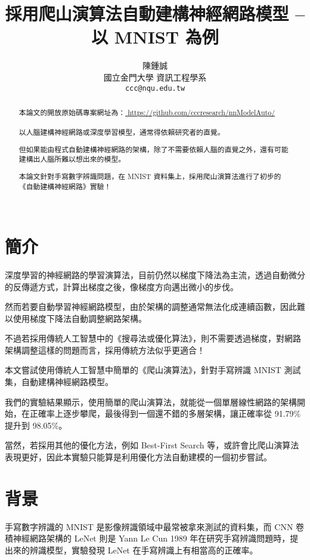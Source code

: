 \documentclass{article}
\title{採用爬山演算法自動建構神經網路模型 -- 以 MNIST 為例}
\author{
    陳鍾誠 \\
    國立金門大學 資訊工程學系\\
    \texttt{ccc@nqu.edu.tw} \\
}
\begin{document}
\maketitle

\begin{abstract}
本論文的開放原始碼專案網址為：\url{ https://github.com/cccresearch/nnModelAuto/ }
\\
\\
以人腦建構神經網路或深度學習模型，通常得依賴研究者的直覺。

但如果能由程式自動建構神經網路的架構，除了不需要依賴人腦的直覺之外，還有可能建構出人腦所難以想出來的模型。

本論文針對手寫數字辨識問題，在 MNIST 資料集上，採用爬山演算法進行了初步的《自動建構神經網路》實驗！\\
\\
\end{abstract}




\section{簡介}

深度學習的神經網路的學習演算法，目前仍然以梯度下降法為主流，透過自動微分的反傳遞方式，計算出梯度之後，像梯度方向邁出微小的步伐。

然而若要自動學習神經網路模型，由於架構的調整通常無法化成連續函數，因此難以使用梯度下降法自動調整網路架構。

不過若採用傳統人工智慧中的《搜尋法或優化算法》，則不需要透過梯度，對網路架構調整這樣的問題而言，採用傳統方法似乎更適合！

本文嘗試使用傳統人工智慧中簡單的《爬山演算法》，針對手寫辨識 MNIST 測試集，自動建構神經網路模型。

我們的實驗結果顯示，使用簡單的爬山演算法，就能從一個單層線性網路的架構開始，在正確率上逐步攀爬，最後得到一個還不錯的多層架構，讓正確率從 91.79\% 提升到 98.05\%。

當然，若採用其他的優化方法，例如 Best-First Search 等，或許會比爬山演算法表現更好，因此本實驗只能算是利用優化方法自動建模的一個初步嘗試。

\section{背景}
\label{background}


手寫數字辨識的 MNIST 是影像辨識領域中最常被拿來測試的資料集，而 CNN 卷積神經網路架構的 LeNet 則是 Yann Le Cun 1989 年在研究手寫辨識問題時，提出來的辨識模型，實驗發現 LeNet 在手寫辨識上有相當高的正確率。
\end{document}
